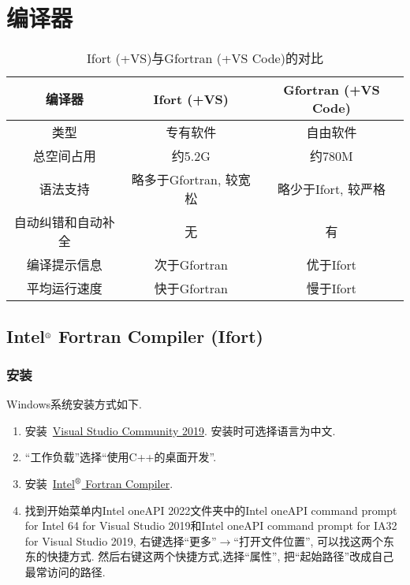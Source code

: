 \chapter{编译器}\label{fortran_compiler}
\def\r{${}^\text{\textregistered}$}

\begin{table}[!htbp]
    \centering
    \begin{tabular}{|c|c|c|}
        \hline
        编译器&Ifort (+VS)&Gfortran (+VS Code)\\
        \hline
        类型&专有软件&自由软件\\
        \hline
        总空间占用&约5.2G&约780M\\
        \hline
        语法支持&略多于Gfortran, 较宽松&略少于Ifort, 较严格\\
        \hline
        自动纠错和自动补全&无&有\\
        \hline
        编译提示信息&次于Gfortran&优于Ifort\\
        \hline
        平均运行速度&快于Gfortran&慢于Ifort\\
        \hline
    \end{tabular}
    \caption{Ifort (+VS)与Gfortran (+VS Code)的对比}
\end{table}

\section[Intel\r{} Fortran Compiler]{Intel\r{} Fortran Compiler (Ifort)}

\subsection{安装}

Windows系统安装方式如下.
\begin{enumerate}
    \item 安装~\href{https://visualstudio.microsoft.com/zh-hans/thank-you-downloading-visual-studio/?sku=Community&rel=16}
    {Visual Studio Community 2019}. 安装时可选择语言为中文.
    \item ``工作负载''选择``使用C++的桌面开发''.
    \item 安装~\href{https://registrationcenter-download.intel.com/akdlm/irc_nas/18412/w_fortran-compiler_p_2022.0.0.77_offline.exe}
    {Intel\r{} Fortran Compiler}.
    \item 找到开始菜单内Intel oneAPI 2022文件夹中的Intel oneAPI command prompt for Intel 64 for Visual Studio 2019和Intel oneAPI command prompt for IA32 for Visual Studio 2019, 右键选择``更多''$\rightarrow$``打开文件位置'', 可以找这两个东东的快捷方式. 然后右键这两个快捷方式,选择``属性'', 把``起始路径''改成自己最常访问的路径.
\end{enumerate}

